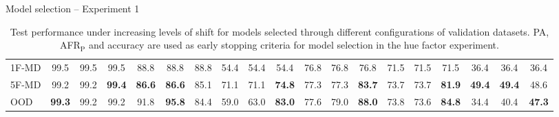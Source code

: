 \begin{frame}{Model selection -- Experiment 1}
\begin{table}[H]
{\begin{tabular}{l|ccc|ccc|ccc|ccc|ccc|ccc}
		1F-MD & 99.5 & 99.5 & 99.5 & 88.8 & 88.8 & 88.8 & 54.4 & 54.4 & 54.4 & 76.8 & 76.8 & 76.8 & 71.5 & 71.5 & 71.5 & 36.4 & 36.4 & 36.4 \\
		5F-MD & 99.2 & 99.2 & {\textbf{99.4}} & {\textbf{86.6}} & \textbf{86.6} & 85.1 & 71.1 & 71.1 & {\textbf{74.8}} & 77.3 & 77.3 & {\textbf{83.7}} & 73.7 & 73.7 & {\textbf{81.9}} & {\textbf{49.4}} & \textbf{49.4} & 48.6 \\
		OOD & {\textbf{99.3}} & 99.2 & 99.2 & 91.8 & {\textbf{95.8}} & 84.4 & 59.0 & 63.0 & {\textbf{83.0}} & 77.6 & 79.0 & {\textbf{88.0}} & 73.8 & 73.6 & {\textbf{84.8}} & 34.4 & 40.4 & {\textbf{47.3}} \\
		\bottomrule
	\end{tabular}%
	}
	\caption{
		Test performance under increasing levels of shift for models selected through different configurations of 
		validation datasets. PA, AFR$_{\text{P}}$ and accuracy are used as early stopping criteria for model selection
		in the hue factor experiment.}
	\end{table}
\end{frame}

